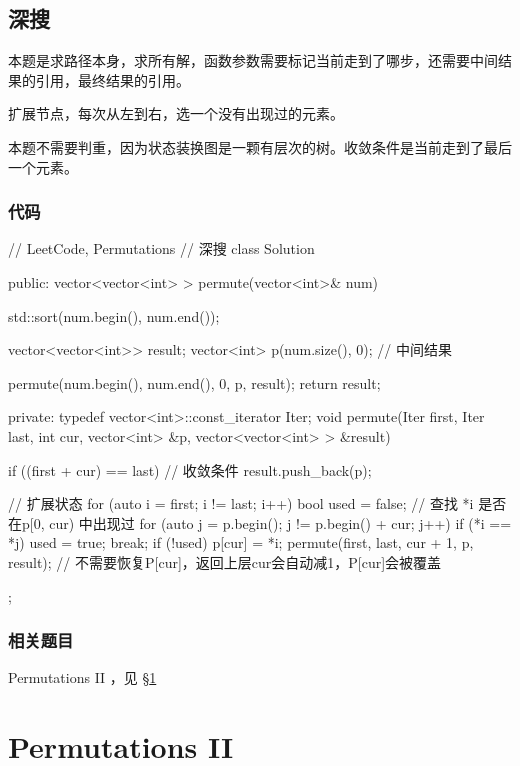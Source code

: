 \subsection{深搜}
本题是求路径本身，求所有解，函数参数需要标记当前走到了哪步，还需要中间结果的引用，最终结果的引用。

扩展节点，每次从左到右，选一个没有出现过的元素。

本题不需要判重，因为状态装换图是一颗有层次的树。收敛条件是当前走到了最后一个元素。

\subsubsection{代码}
\begin{Code}
// LeetCode, Permutations
// 深搜
class Solution {
public:
    vector<vector<int> > permute(vector<int>& num) {
        std::sort(num.begin(), num.end());

        vector<vector<int>> result;
        vector<int> p(num.size(), 0);  // 中间结果

        permute(num.begin(), num.end(), 0, p, result);
        return result;
    }
private:
    typedef vector<int>::const_iterator Iter;
    void permute(Iter first, Iter last, int cur, vector<int> &p,
            vector<vector<int> > &result) {
        if ((first + cur) == last) {  // 收敛条件
            result.push_back(p);
        }

        // 扩展状态
        for (auto i = first; i != last; i++) {
            bool used = false;
            // 查找 *i 是否在p[0, cur) 中出现过
            for (auto j = p.begin(); j != p.begin() + cur; j++) {
                if (*i == *j) {
                    used = true;
                    break;
                }
            }
            if (!used) {
                p[cur] = *i;
                permute(first, last, cur + 1, p, result);
                // 不需要恢复P[cur]，返回上层cur会自动减1，P[cur]会被覆盖
            }
        }
    }
};
\end{Code}


\subsubsection{相关题目}
\begindot
\item Permutations II ，见 \S \ref{sec:permutations-ii}
\myenddot


\section{Permutations II} %
\label{sec:permutations-ii}


